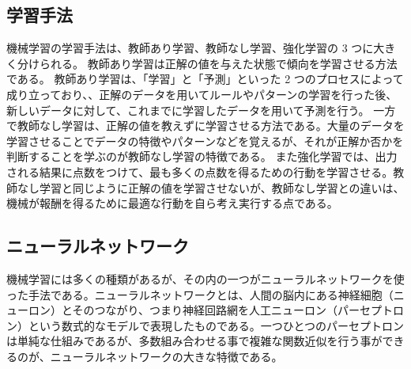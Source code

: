 \subsection{学習手法}
機械学習の学習手法は、教師あり学習、教師なし学習、強化学習の 3 つに大きく分けられる。
教師あり学習は正解の値を与えた状態で傾向を学習させる方法である。
教師あり学習は、「学習」と「予測」といった 2 つのプロセスによって成り立っており、、正解のデータを用いてルールやパターンの学習を行った後、新しいデータに対して、これまでに学習したデータを用いて予測を行う。
一方で教師なし学習は、正解の値を教えずに学習させる方法である。大量のデータを学習させることでデータの特徴やパターンなどを覚えるが、それが正解か否かを判断することを学ぶのが教師なし学習の特徴である。
また強化学習では、出力される結果に点数をつけて、最も多くの点数を得るための行動を学習させる。教師なし学習と同じように正解の値を学習させないが、教師なし学習との違いは、機械が報酬を得るために最適な行動を自ら考え実行する点である。

\subsection{ニューラルネットワーク}
機械学習には多くの種類があるが、その内の一つがニューラルネットワークを使った手法である。ニューラルネットワークとは、人間の脳内にある神経細胞（ニューロン）とそのつながり、つまり神経回路網を人工ニューロン（パーセプトロン）という数式的なモデルで表現したものである。一つひとつのパーセプトロンは単純な仕組みであるが、多数組み合わせる事で複雑な関数近似を行う事ができるのが、ニューラルネットワークの大きな特徴である。

